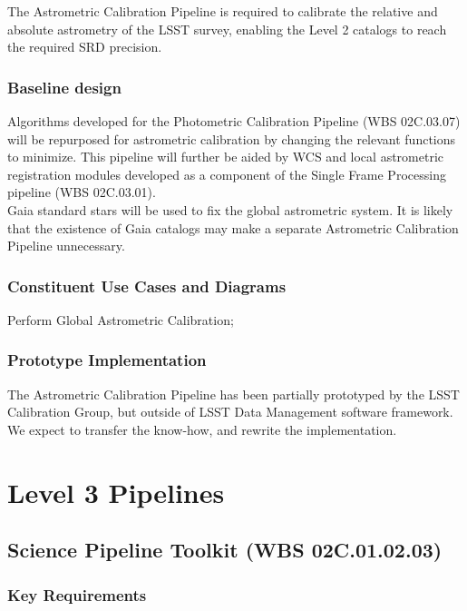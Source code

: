 \documentclass[12pt]{article}
\newcommand{\wbsSFM}{WBS 02C.03.01}
\newcommand{\wbsSPT}{WBS 02C.01.02.03}
\newcommand{\wbsPhotoCal}{WBS 02C.03.07}
\begin{document}
The Astrometric Calibration Pipeline is required to calibrate the relative and absolute astrometry of the LSST survey, enabling the Level 2 catalogs to reach the required SRD precision.

\subsubsection{Baseline design}

Algorithms developed for the Photometric Calibration Pipeline (\wbsPhotoCal) will be repurposed for astrometric calibration by changing the relevant functions to minimize. This pipeline will further be aided by WCS and local astrometric registration modules developed as a component of the Single Frame Processing pipeline (\wbsSFM).
\\

Gaia standard stars will be used to fix the global astrometric system. It is likely that the existence of Gaia catalogs may make a separate Astrometric Calibration Pipeline unnecessary.

\subsubsection{Constituent Use Cases and Diagrams}

Perform Global Astrometric Calibration;

\subsubsection{Prototype Implementation}

The Astrometric Calibration Pipeline has been partially prototyped by the LSST Calibration Group, but outside of LSST Data Management software framework. We expect to transfer the know-how, and rewrite the implementation.

\clearpage

\section{Level 3 Pipelines}

\subsection{Science Pipeline Toolkit (\wbsSPT)}

\subsubsection{Key Requirements}
\end{document}
